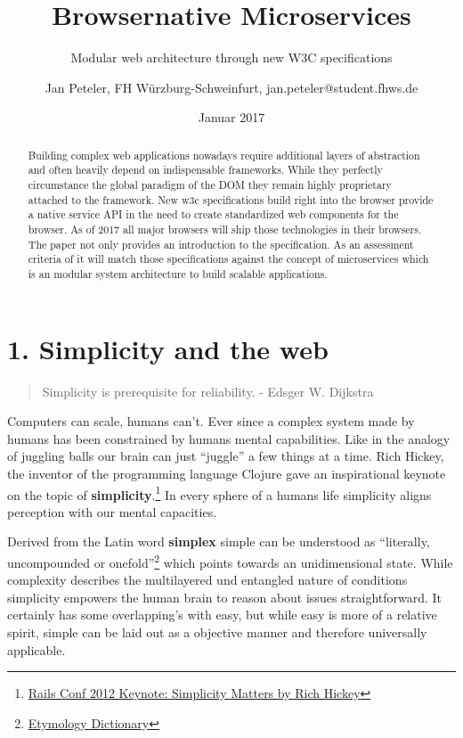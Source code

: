 \documentclass[]{article}
\title{Browsernative Microservices}
\subtitle{Modular web architecture through new W3C specifications}
\author{Jan Peteler, FH Würzburg-Schweinfurt, jan.peteler@student.fhws.de}
\date{Januar 2017}
\begin{document}
\maketitle
\begin{abstract}
Building complex web applications nowadays require additional layers of
abstraction and often heavily depend on indispensable frameworks. While
they perfectly circumstance the global paradigm of the DOM they remain
highly proprietary attached to the framework. New w3c specifications
build right into the browser provide a native service API in the need to
create standardized web components for the browser. As of 2017 all major
browsers will ship those technologies in their browsers. The paper not
only provides an introduction to the specification. As an assessment
criteria of it will match those specifications against the concept of
microservices which is an modular system architecture to build scalable
applications.
\end{abstract}

{
\setcounter{tocdepth}{3}
\tableofcontents
}
\section{1. Simplicity and the web}\label{simplicity-and-the-web}

\begin{quote}
Simplicity is prerequisite for reliability. - Edsger W. Dijkstra
\end{quote}

Computers can scale, humans can't. Ever since a complex system made by
humans has been constrained by humans mental capabilities. Like in the
analogy of juggling balls our brain can just ``juggle'' a few things at
a time. Rich Hickey, the inventor of the programming language Clojure
gave an inspirational keynote on the topic of
\textbf{simplicity}.\footnote{\href{https://www.youtube.com/watch?v=rI8tNMsozo0\&t=46s}{Rails
  Conf 2012 Keynote: Simplicity Matters by Rich Hickey}} In every sphere
of a humans life simplicity aligns perception with our mental
capacities.

Derived from the Latin word \textbf{simplex} simple can be understood as
``literally, uncompounded or onefold''\footnote{\href{http://www.etymonline.com/index.php?term=simple}{Etymology
  Dictionary}} which points towards an unidimensional state. While
complexity describes the multilayered und entangled nature of conditions
simplicity empowers the human brain to reason about issues
straightforward. It certainly has some overlapping's with easy, but
while easy is more of a relative spirit, simple can be laid out as a
objective manner and therefore universally applicable.
\end{document}

